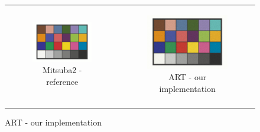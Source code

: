 \renewcommand\thesubfigure{\arabic{subfigure}}
\begin{figure}[h]
	\centering
	\begin{tabular}{cc}
		\begin{subfigure}
			{0.4\textwidth}\centering\includegraphics[width=\linewidth]{img/macbeth_chart_D65.png}
			\caption{Mitsuba2 - reference}
		\end{subfigure}
		&
		\begin{subfigure}
			{0.4\textwidth}\centering\includegraphics[width=\linewidth]{img/macbeth_chart_D65_ART.png}
			\caption{ART - our implementation}
		\end{subfigure} \\
		\begin{subfigure}

\end{subfigure}
\end{tabular}
\end{figure}
